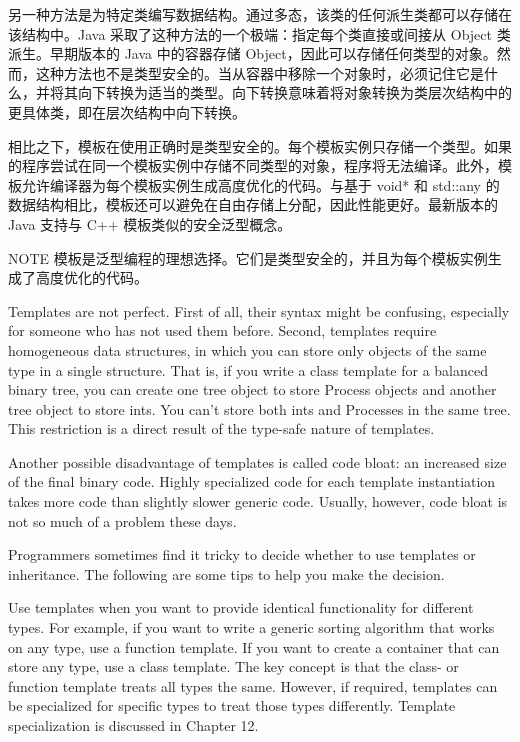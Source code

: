 另一种方法是为特定类编写数据结构。通过多态，该类的任何派生类都可以存储在该结构中。Java 采取了这种方法的一个极端：指定每个类直接或间接从 Object 类派生。早期版本的 Java 中的容器存储 Object，因此可以存储任何类型的对象。然而，这种方法也不是类型安全的。当从容器中移除一个对象时，必须记住它是什么，并将其向下转换为适当的类型。向下转换意味着将对象转换为类层次结构中的更具体类，即在层次结构中向下转换。

相比之下，模板在使用正确时是类型安全的。每个模板实例只存储一个类型。如果的程序尝试在同一个模板实例中存储不同类型的对象，程序将无法编译。此外，模板允许编译器为每个模板实例生成高度优化的代码。与基于 void* 和 std::any 的数据结构相比，模板还可以避免在自由存储上分配，因此性能更好。最新版本的 Java 支持与 C++ 模板类似的安全泛型概念。

\begin{myNotic}{NOTE}
模板是泛型编程的理想选择。它们是类型安全的，并且为每个模板实例生成了高度优化的代码。
\end{myNotic}


Templates are not perfect. First of all, their syntax might be confusing, especially for someone who has not used them before. Second, templates require homogeneous data structures, in which you can store only objects of the same type in a single structure. That is, if you write a class template for a balanced binary tree, you can create one tree object to store Process objects and another tree object to store ints. You can’t store both ints and Processes in the same tree. This restriction is a direct result of the type-safe nature of templates.

Another possible disadvantage of templates is called code bloat: an increased size of the final binary code. Highly specialized code for each template instantiation takes more code than slightly slower generic code. Usually, however, code bloat is not so much of a problem these days.


Programmers sometimes find it tricky to decide whether to use templates or inheritance. The following are some tips to help you make the decision.

Use templates when you want to provide identical functionality for different types. For example, if you want to write a generic sorting algorithm that works on any type, use a function template. If you want to create a container that can store any type, use a class template. The key concept is that the class- or function template treats all types the same. However, if required, templates can be specialized for specific types to treat those types differently. Template specialization is discussed in Chapter 12.

